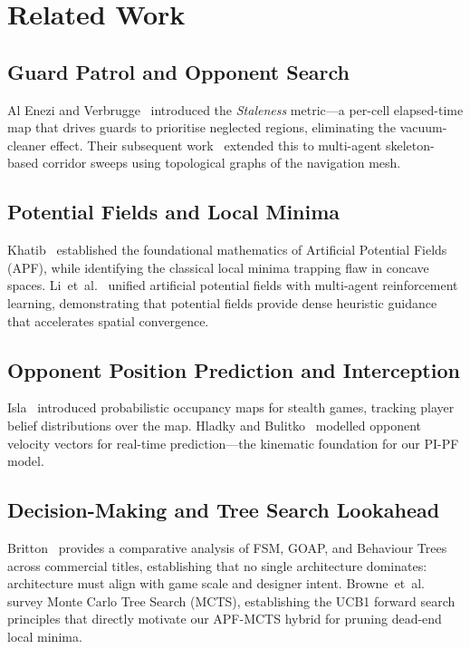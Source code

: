 \documentclass[conference,onecolumn]{IEEEtran}
\begin{document}
\section{Related Work}

\subsection{Guard Patrol and Opponent Search}
Al Enezi and Verbrugge~\cite{alenezi2020} introduced the
\emph{Staleness} metric---a per-cell elapsed-time map that drives
guards to prioritise neglected regions, eliminating the
vacuum-cleaner effect. Their subsequent work~\cite{alenezi2021}
extended this to multi-agent skeleton-based corridor sweeps using
topological graphs of the navigation mesh.

\subsection{Potential Fields and Local Minima}
Khatib~\cite{khatib1986} established the foundational mathematics
of Artificial Potential Fields (APF), while identifying the classical
local minima trapping flaw in concave spaces. Li~et~al.~\cite{li2024}
unified artificial potential fields with multi-agent reinforcement
learning, demonstrating that potential fields provide dense heuristic
guidance that accelerates spatial convergence.

\subsection{Opponent Position Prediction and Interception}
Isla~\cite{isla2013} introduced probabilistic occupancy maps for
stealth games, tracking player belief distributions over the map.
Hladky and Bulitko~\cite{hladky2008} modelled opponent velocity
vectors for real-time prediction---the kinematic foundation for our
PI-PF model.

\subsection{Decision-Making and Tree Search Lookahead}
Britton~\cite{britton2022} provides a comparative analysis of FSM,
GOAP, and Behaviour Trees across commercial titles, establishing that
no single architecture dominates: architecture must align with game
scale and designer intent. Browne~et~al.~\cite{browne2012} survey
Monte Carlo Tree Search (MCTS), establishing the UCB1 forward search
principles that directly motivate our APF-MCTS hybrid for pruning
dead-end local minima.
\end{document}
